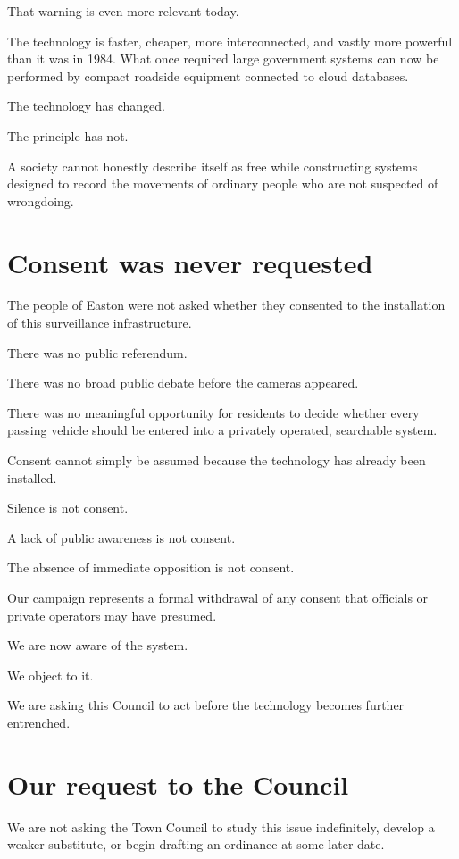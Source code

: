 \documentclass[11pt]{article}
\begin{document}
That warning is even more relevant today.

The technology is faster, cheaper, more interconnected, and vastly more powerful than it was in 1984. What once required large government systems can now be performed by compact roadside equipment connected to cloud databases.

The technology has changed.

The principle has not.

A society cannot honestly describe itself as free while constructing systems designed to record the movements of ordinary people who are not suspected of wrongdoing.

\section*{Consent was never requested}
\label{sec:org6ee5f74}

The people of Easton were not asked whether they consented to the installation of this surveillance infrastructure.

There was no public referendum.

There was no broad public debate before the cameras appeared.

There was no meaningful opportunity for residents to decide whether every passing vehicle should be entered into a privately operated, searchable system.

Consent cannot simply be assumed because the technology has already been installed.

Silence is not consent.

A lack of public awareness is not consent.

The absence of immediate opposition is not consent.

Our campaign represents a formal withdrawal of any consent that officials or private operators may have presumed.

We are now aware of the system.

We object to it.

We are asking this Council to act before the technology becomes further entrenched.

\section*{Our request to the Council}
\label{sec:orga38907b}

We are not asking the Town Council to study this issue indefinitely, develop a weaker substitute, or begin drafting an ordinance at some later date.
\end{document}
